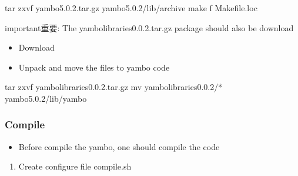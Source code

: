 \documentclass[a4paper,12pt,english]{sphinxmanual}
\begin{document}
\begin{sphinxVerbatim}[commandchars=\\\{\}]
tar zxvf yambo\PYGZhy{}5.0.2.tar.gz   yambo\PYGZhy{}5.0.2/lib/archive  
    make \PYGZhy{}f Makefile.loc
\end{sphinxVerbatim}

\begin{sphinxadmonition}{important}{重要:}
\sphinxAtStartPar
The yambo\sphinxhyphen{}libraries\sphinxhyphen{}0.0.2.tar.gz package should also be download
\end{sphinxadmonition}
\begin{itemize}
\item {} 
\sphinxAtStartPar
Download %
\begin{footnote}[10]\sphinxAtStartFootnote
{}
%
\end{footnote}

\item {} 
\sphinxAtStartPar
Unpack and move the files to yambo code

\end{itemize}

\begin{sphinxVerbatim}[commandchars=\\\{\}]
tar zxvf yambo\PYGZhy{}libraries\PYGZhy{}0.0.2.tar.gz  
    mv yambo\PYGZhy{}libraries\PYGZhy{}0.0.2/* yambo\PYGZhy{}5.0.2/lib/yambo
\end{sphinxVerbatim}


\subsubsection{Compile}
\label{\detokenize{compile/yambo_5.0.2:compile}}\begin{itemize}
\item {} 
\sphinxAtStartPar
Before compile the yambo, one should compile the {\hyperref[\detokenize{compile/hdf5_1.12.0::doc}]{}} code

\end{itemize}
\begin{enumerate}
%
\item {} 
\sphinxAtStartPar
Create configure file compile.sh

\end{enumerate}
\end{document}
